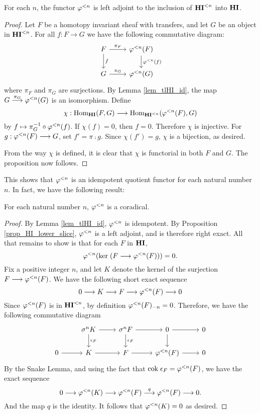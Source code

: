 \begin{prop}\label{prop_HI_lower_slice}
For each $n$, the functor $\tlHI{n}$ is left adjoint to the 
inclusion of $\TLHI{n}{\HI}$ into $\HI$.
\end{prop}
\begin{proof}
Let $F$ be a homotopy invariant sheaf with transfers, and let $G$ 
be an object in $\TLHI{n}{\HI}$. For all $f: F \to G$ we have the 
following commutative diagram:
\[
\begin{tikzcd}
F \arrow{r}{\pi_F} \arrow{d}{f}
& \tlHI{n}(F) \arrow{d}{\tlHI{n}(f)} \\
G \arrow{r}{\pi_G}
& \tlHI{n}(G) 
\end{tikzcd}
\]
where $\pi_F$ and $\pi_G$ are surjections. By Lemma \ref{lem_tlHI_id},
the map $G \stackrel{\pi_G}{\to} \tlHI{n}(G)$ is an
isomorphism. Define
\[
\chi : \homHI(F, G) \to \hom_{\TLHI{n}{\HI}}(\tlHI{n}(F), G)
\]
by $f \mapsto \pi_G^{-1} \circ \tlHI{n}(f)$. If $\chi(f) = 0$, 
then $f = 0$. Therefore $\chi$ is injective. For $g: \tlHI{n}(F) 
\to G$, set $f' = \pi \comp g$. Since $\chi(f') = g$, $\chi$ is a 
bijection, as desired.

From the way $\chi$ is defined, it is clear that $\chi$ is 
functorial in both $F$ and $G$. The proposition now follows.
\end{proof}

This shows that $\tlHI{n}$ is an idempotent quotient functor
for each natural number $n$. In fact, we have the following 
result:

\begin{prop}\label{prop_tlHIn_corad}
For each natural number $n$, $\tlHI{n}$ is a coradical.
\end{prop}
\begin{proof}
By Lemma \ref{lem_tlHI_id}, $\tlHI{n}$ is idempotent. By Proposition
\ref{prop_HI_lower_slice}, $\tlHI{n}$ is a left adjoint, and
is therefore right exact. All that remains to show is that for
each $F$ in $\HI$,
\[
\tlHI{n}(\ker (F \to \tlHI{n}(F))) = 0.
\]
Fix a positive integer $n$, and let $K$ denote the kernel of the 
surjection $F \to \tlHI{n}(F)$. We have the following short exact 
sequence 
\[
0 \to K \to F \to \tlHI{n}(F) \to 0
\]
Since $\tlHI{n}(F)$ is in $\TLHI{n}{\HI}$, by definition 
$\RHI[n]{\tlHI{n}(F)} = 0$. Therefore, we have the following
commutative diagram
\[
\begin{tikzcd}
{} &\sgHI{n} K \arrow{d}{\cuHI_F} \arrow{r}
   &\sgHI{n} F \arrow{d}{\cuHI_F} \arrow{r}
   &0 \arrow{d} \arrow{r}
   &0 \\
0 \arrow{r} &
  K \arrow{r}&
  F \arrow{r}&
  \tlHI{n}(F) \arrow{r}&
  0
\end{tikzcd}
\]
By the Snake Lemma, and using the fact that $\cok \cuHI_F = 
\tlHI{n}(F)$, we have the exact sequence
\[
0 \to \tlHI{n}(K) \to \tlHI{n}(F) \stackrel{q}{\to} \tlHI{n}(F) 
   \to 0.
\]
And the map $q$ is the identity. It follows that $\tlHI{n}(K) = 0$ 
as desired.
\end{proof}

